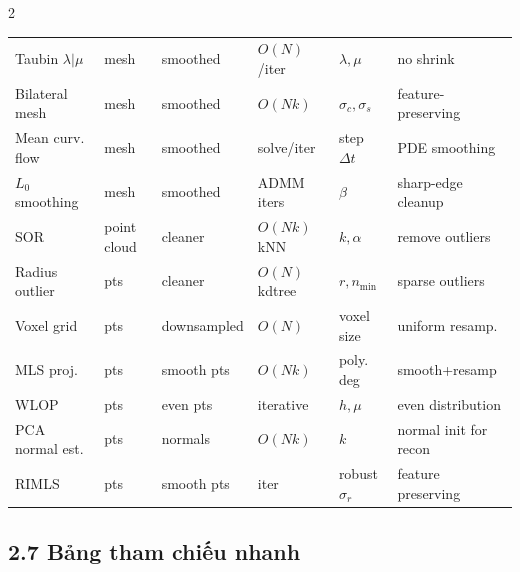 \begin{paracol}{2}
\begin{tabular}{@{}p{2.4cm}p{1.4cm}p{1.5cm}p{1.5cm}p{1.9cm}p{2.2cm}@{}}
Taubin $\lambda|\mu$ & mesh & smoothed & $O(N)$/iter & $\lambda,\mu$ & no shrink \\
Bilateral mesh & mesh & smoothed & $O(Nk)$ & $\sigma_c,\sigma_s$ & feature-preserving \\
Mean curv. flow & mesh & smoothed & solve/iter & step $\Delta t$ & PDE smoothing \\
$L_0$ smoothing & mesh & smoothed & ADMM iters & $\beta$ & sharp-edge cleanup \\
SOR & point cloud & cleaner & $O(Nk)$ kNN & $k,\alpha$ & remove outliers \\
Radius outlier & pts & cleaner & $O(N)$ kdtree & $r,n_{\min}$ & sparse outliers \\
Voxel grid & pts & down\-sampled & $O(N)$ & voxel size & uniform resamp. \\
MLS proj. & pts & smooth pts & $O(Nk)$ & poly. deg & smooth+resamp \\
WLOP & pts & even pts & iterative & $h,\mu$ & even distribution \\
PCA normal est. & pts & normals & $O(Nk)$ & $k$ & normal init for recon \\
RIMLS & pts & smooth pts & iter & robust $\sigma_r$ & feature preserving \\
\bottomrule
\end{tabular}
\normalsize

\switchcolumn

\subsection*{2.7 Bảng tham chiếu nhanh}


\end{paracol}
